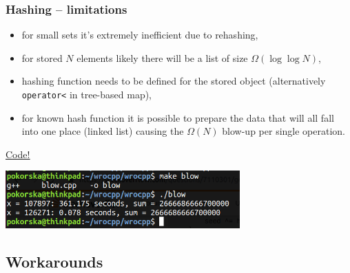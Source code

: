 \documentclass{beamer}
\begin{document}
\begin{frame}
    \frametitle{Hashing -- limitations}
    \pause
    \begin{itemize}
        \item for small sets it's extremely inefficient due to rehashing, \pause
        \item for stored $N$ elements likely there will be a list
            of size $\Omega(\log \log N)$, \pause
        \item hashing function needs to be defined for the stored object
            (alternatively \texttt{operator<} in tree-based map), \pause
        \item for known hash function it is possible to prepare the data
            that will all fall into one place (linked list) causing
            the $\Omega(N)$ blow-up per single operation. \pause
    \end{itemize}

    \textcolor{gray}{\href{https://github.com/gcc-mirror/gcc/blob/5bea0e90e58d971cf3e67f784a116d81a20b927a/libstdc\%2B\%2B-v3/src/shared/hashtable-aux.cc}
        {\underline{Code!}}} \pause

    \begin{center}
    \includegraphics[width=9cm]{blow.png}
    \end{center}
\end{frame}

\subsection{Workarounds}
\end{document}
